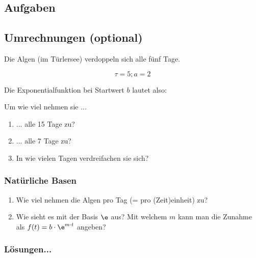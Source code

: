 \subsection*{Aufgaben}


\newpage



\subsection{Umrechnungen (optional)}
Die Algen (im Türlersee) verdoppeln sich alle fünf Tage.

$$\tau = 5; a= 2$$

Die Exponentialfunktion bei Startwert $b$ lautet also:



Um wie viel nehmen sie ...

\begin{enumerate}
\item ... alle 15 Tage zu?
\item ... alle 7 Tage zu?
\item In wie vielen Tagen verdreifachen sie sich?
\end{enumerate}
\subsubsection{Natürliche Basen}

\begin{enumerate}[resume]
\item Wie viel nehmen die Algen pro Tag (= pro (Zeit)einheit) zu?
\item Wie sieht es mit der Basis $\e$ aus? Mit welchem $m$ kann man die
  Zunahme als $f(t) = b \cdot{} \e^{m\cdot{}t}$ angeben?
\end{enumerate}
\newpage


\subsubsection*{Lösungen...}

